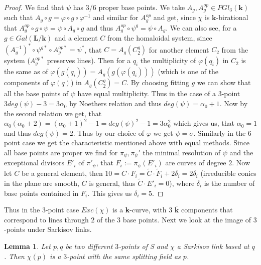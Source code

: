 \documentclass[12pt, oneside, reqno]{amsart}
\newtheorem{lemma}[theorem]{Lemma}
\begin{document}
\begin{proof}
    We find that $\psi$ has $3$/$6$ proper base points. We take $A_g, A_g^{op} \in PGl_3(\textbf{k})$ such that $A_g \circ g = \varphi \circ g \circ \varphi^{-1}$ and similar for $A_g^{op}$ and get, since $\chi$ is $\textbf{k}$-birational that $A_g^{op} \circ g \circ \psi = \psi \circ A_g \circ g$ and thus $A_g^{op} \circ \psi^g = \psi \circ A_g$. We can also see, for a $g \in Gal(\textbf{L}/\textbf{k})$ and a element $C$ from the homaloidal system, since $(A_{g}^{-1 })^* \circ \psi^{g*} \circ A_g^{op*} = \psi^*$, that $C = A_g(C_2^g)$ for another element $C_2$ from the system ($A_g^{op*}$ preserves lines). Then for a $q_i$ the multiplicity of $\varphi(q_i)$ in $C_2$ is the same as of $\varphi(g(q_i)) = A_g(g(\varphi(q_i)))$ (which is one of the components of $\varphi(q)$) in $A_g(C_2^g) = C$. By choosing fitting $g$ we can show that all the base points of $\psi$ have equal multiplicity. Thus in the case of a $3$-point $3deg(\psi) - 3 = 3\alpha_0$ by Noethers relation and thus $deg(\psi) = \alpha_0 + 1$. Now by the second relation we get, that $\alpha_0(\alpha_0 + 2) = (\alpha_0 + 1)^2 - 1 = deg(\psi)^2 - 1 = 3 \alpha_0^2$ which gives us, that $\alpha_0 = 1$ and thus $deg(\psi) = 2$. Thus by our choice of $\varphi$ we get $\psi = \sigma$. Similarly in the $6$-point case we get the characteristic mentioned above with equal methods. Since all base points are proper we find for $\pi_{\psi},\pi_{\psi}'$ the minimal resolution of $\psi$ and the exceptional divisors $E'_i$ of $\pi'_{\psi}$, that $F_i:=\pi_{\psi}(E'_i)$ are curves of degree $2$. Now let $C$ be a general element, then $10 = C \cdot F_i = \tilde C \cdot \tilde F_i + 2\delta_i = 2\delta_i$ (irreducible conics in the plane are smooth, $C$ is general, thus $\tilde C \cdot E'_i = 0$), where $\delta_i$ is the number of base points contained in $F_i$. This gives us $\delta_i = 5$.
\end{proof}
\noindent
Thus in the $3$-point case $Exc(\chi)$ is a \textbf{k}-curve, with $3$ $\bar{\textbf{k}}$ components that correspond to lines through $2$ of the $3$ base points. Next we look at the image of $3$-points under Sarkisov links.
\begin{lemma} \label{ImageOf3P}
    Let $p,q$ be two different $3$-points of S and $\chi$ a Sarkisov link based at $q$. Then $\chi(p)$ is a $3$-point with the same splitting field as $p$.
\end{lemma}
\end{document}
